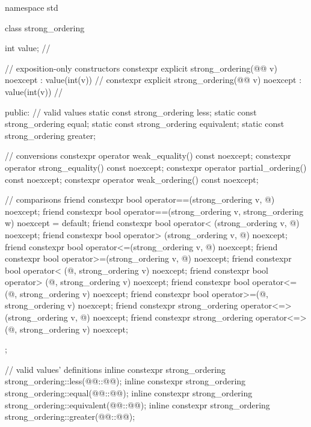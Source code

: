 %
%
%
%
%
\begin{codeblock}
namespace std {
  class strong_ordering {
    int value;  // \expos

    // exposition-only constructors
    constexpr explicit strong_ordering(@@ v) noexcept : value(int(v)) {}    // \expos
    constexpr explicit strong_ordering(@@ v) noexcept : value(int(v)) {}   // \expos

  public:
    // valid values
    static const strong_ordering less;
    static const strong_ordering equal;
    static const strong_ordering equivalent;
    static const strong_ordering greater;

    // conversions
    constexpr operator weak_equality() const noexcept;
    constexpr operator strong_equality() const noexcept;
    constexpr operator partial_ordering() const noexcept;
    constexpr operator weak_ordering() const noexcept;

    // comparisons
    friend constexpr bool operator==(strong_ordering v, @\unspec@) noexcept;
    friend constexpr bool operator==(strong_ordering v, strong_ordering w) noexcept = default;
    friend constexpr bool operator< (strong_ordering v, @\unspec@) noexcept;
    friend constexpr bool operator> (strong_ordering v, @\unspec@) noexcept;
    friend constexpr bool operator<=(strong_ordering v, @\unspec@) noexcept;
    friend constexpr bool operator>=(strong_ordering v, @\unspec@) noexcept;
    friend constexpr bool operator< (@\unspec@, strong_ordering v) noexcept;
    friend constexpr bool operator> (@\unspec@, strong_ordering v) noexcept;
    friend constexpr bool operator<=(@\unspec@, strong_ordering v) noexcept;
    friend constexpr bool operator>=(@\unspec@, strong_ordering v) noexcept;
    friend constexpr strong_ordering operator<=>(strong_ordering v, @\unspec@) noexcept;
    friend constexpr strong_ordering operator<=>(@\unspec@, strong_ordering v) noexcept;
  };

  // valid values' definitions
  inline constexpr strong_ordering strong_ordering::less(@@::@@);
  inline constexpr strong_ordering strong_ordering::equal(@@::@@);
  inline constexpr strong_ordering strong_ordering::equivalent(@@::@@);
  inline constexpr strong_ordering strong_ordering::greater(@@::@@);
}
\end{codeblock}

